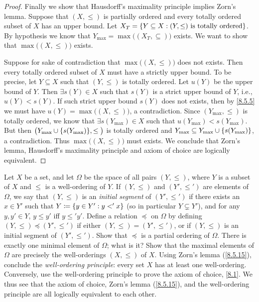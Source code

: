 \begin{proof}
  Finally we show that Hausdorff's maximality principle implies Zorn's lemma.
  Suppose that \((X, \leq)\) is partially ordered and every totally ordered subset of \(X\) has an upper bound.
  Let \(X_T = \left\lbrace Y \subseteq X : (Y, \leq) \text{ is totally ordered}\right\rbrace\).
  By hypothesis we know that \(Y_{\max} = \max\big((X_T, \subseteq)\big)\) exists.
  We want to show that \(\max\big((X, \leq)\big)\) exists.

  Suppose for sake of contradiction that \(\max\big((X, \leq)\big)\) does not exists.
  Then every totally ordered subset of \(X\) must have a strictly upper bound.
  To be precise, let \(Y \subseteq X\) such that \((Y, \leq)\) is totally ordered.
  Let \(u(Y)\) be the upper bound of \(Y\).
  Then \(\exists s(Y) \in X\) such that \(s(Y)\) is a strict upper bound of \(Y\), i.e., \(u(Y) < s(Y)\).
  If such strict upper bound \(s(Y)\) does not exists, then by \cref{8.5.5} we must have \(u(Y) = \max\big((X, \leq)\big)\), a contradiction.
  Since \((Y_{\max}, \leq)\) is totally ordered, we know that \(\exists s(Y_{\max}) \in X\) such that \(u(Y_{\max}) < s(Y_{\max})\).
  But then \(\big(Y_{\max} \cup \set{s(Y_{\max})}, \leq\big)\) is totally ordered and \(Y_{\max} \subseteq Y_{\max} \cup \left\lbrace s(Y_{\max})\right\rbrace\), a contradiction.
  Thus \(\max\big((X, \leq)\big)\) must exists.
  We conclude that Zorn's lemma, Hausdorff's maximality principle and axiom of choice are logically equivalent.
\end{proof}

\begin{ex}\label{ex:8.5.19}
  Let \(X\) be a set, and let \(\Omega\) be the space of all pairs \((Y, \leq)\), where \(Y\) is a subset of \(X\) and \(\leq\) is a well-ordering of \(Y\).
  If \((Y, \leq)\) and \((Y', \leq')\) are elements of \(\Omega\), we say that \((Y, \leq)\) is an \emph{initial segment} of \((Y', \leq')\) if there exists an \(x \in Y'\) such that \(Y \coloneqq \left\lbrace y \in Y' : y <' x\right\rbrace\) (so in particular \(Y \subsetneq Y'\)), and for any \(y, y' \in Y\), \(y \leq y'\) iff \(y \leq' y'\).
  Define a relation \(\preceq\) on \(\Omega\) by defining \((Y, \leq) \preceq (Y', \leq')\) if either \((Y, \leq) = (Y', \leq')\), or if \((Y, \leq)\) is an initial segment of \((Y', \leq')\).
  Show that \(\preceq\) is a partial ordering of \(\Omega\).
  There is exactly one minimal element of \(\Omega\);
  what is it?
  Show that the maximal elements of \(\Omega\) are precisely the well-orderings \((X, \leq)\) of \(X\).
  Using Zorn's lemma (\cref{8.5.15}), conclude the \emph{well-ordering principle}:
  every set \(X\) has at least one well-ordering.
  Conversely, use the well-ordering principle to prove the axiom of choice, \cref{8.1}.
  We thus see that the axiom of choice, Zorn's lemma (\cref{8.5.15}), and the well-ordering principle are all logically equivalent to each other.
\end{ex}


